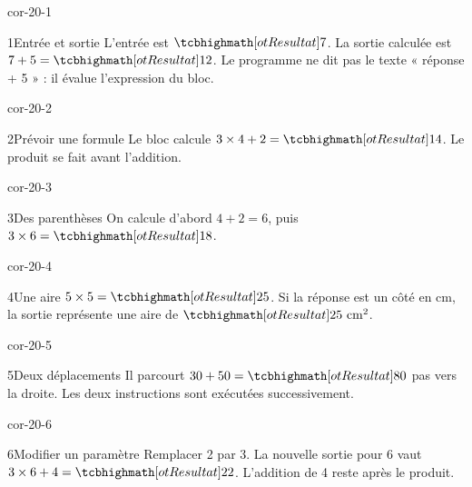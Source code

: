 \clearpage\pagestyle{otMain}\setlength{\otBlocEspacement}{2.5mm}\fontsize{11}{15}\selectfont{}
\begin{blocLivre}{cor-20-1}\begin{corrige}{1}{Entrée et sortie}
L’entrée est $\res7$. La sortie calculée est $7+5=\res{12}$. Le programme ne dit pas le texte « réponse + 5 » : il évalue l’expression du bloc.
\label{fig-cor-20-1}
\end{corrige}\end{blocLivre}
\begin{blocLivre}{cor-20-2}\begin{corrige}{2}{Prévoir une formule}
Le bloc calcule $3\times4+2=\res{14}$. Le produit se fait avant l’addition.
\label{fig-cor-20-2}
\end{corrige}\end{blocLivre}
\begin{blocLivre}{cor-20-3}\begin{corrige}{3}{Des parenthèses}
On calcule d’abord $4+2=6$, puis $3\times6=\res{18}$.
\label{fig-cor-20-3}
\end{corrige}\end{blocLivre}
\begin{blocLivre}{cor-20-4}\begin{corrige}{4}{Une aire}
$5\times5=\res{25}$. Si la réponse est un côté en cm, la sortie représente une aire de $\res{25\ \mathrm{cm}^2}$.
\label{fig-cor-20-4}
\end{corrige}\end{blocLivre}
\begin{blocLivre}{cor-20-5}\begin{corrige}{5}{Deux déplacements}
Il parcourt $30+50=\res{80}$ pas vers la droite. Les deux instructions sont exécutées successivement.
\label{fig-cor-20-5}
\end{corrige}\end{blocLivre}
\begin{blocLivre}{cor-20-6}\begin{corrige}{6}{Modifier un paramètre}
Remplacer 2 par 3. La nouvelle sortie pour 6 vaut $3\times6+4=\res{22}$. L’addition de 4 reste après le produit.
\label{fig-cor-20-6}
\end{corrige}\end{blocLivre}

